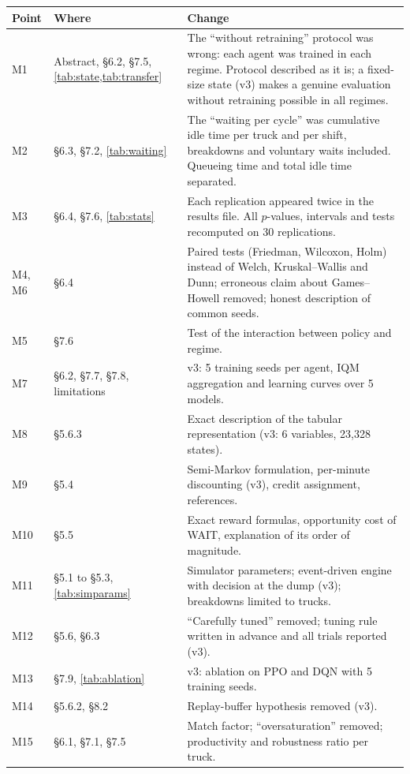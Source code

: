 \documentclass[11pt,a4paper]{article}
\begin{document}
\footnotesize
\begin{longtable}{p{2.2cm}p{4.3cm}p{8.6cm}}
\toprule
\textbf{Point} & \textbf{Where} & \textbf{Change} \\
\midrule
\endhead
M1 & Abstract, §6.2, §7.5, \cref{tab:state,tab:transfer} & The ``without retraining'' protocol was wrong: each agent was trained in each regime. Protocol described as it is; a fixed-size state (v3) makes a genuine evaluation without retraining possible in all regimes. \\
M2 & §6.3, §7.2, \cref{tab:waiting} & The ``waiting per cycle'' was cumulative idle time per truck and per shift, breakdowns and voluntary waits included. Queueing time and total idle time separated. \\
M3 & §6.4, §7.6, \cref{tab:stats} & Each replication appeared twice in the results file. All $p$-values, intervals and tests recomputed on 30 replications. \\
M4, M6 & §6.4 & Paired tests (Friedman, Wilcoxon, Holm) instead of Welch, Kruskal--Wallis and Dunn; erroneous claim about Games--Howell removed; honest description of common seeds. \\
M5 & §7.6 & Test of the interaction between policy and regime. \\
M7 & §6.2, §7.7, §7.8, limitations & v3: 5 training seeds per agent, IQM aggregation and learning curves over 5 models. \\
M8 & §5.6.3 & Exact description of the tabular representation (v3: 6 variables, 23,328 states). \\
M9 & §5.4 & Semi-Markov formulation, per-minute discounting (v3), credit assignment, references. \\
M10 & §5.5 & Exact reward formulas, opportunity cost of WAIT, explanation of its order of magnitude. \\
M11 & §5.1 to §5.3, \cref{tab:simparams} & Simulator parameters; event-driven engine with decision at the dump (v3); breakdowns limited to trucks. \\
M12 & §5.6, §6.3 & ``Carefully tuned'' removed; tuning rule written in advance and all trials reported (v3). \\
M13 & §7.9, \cref{tab:ablation} & v3: ablation on PPO and DQN with 5 training seeds. \\
M14 & §5.6.2, §8.2 & Replay-buffer hypothesis removed (v3). \\
M15 & §6.1, §7.1, §7.5 & Match factor; ``oversaturation'' removed; productivity and robustness ratio per truck. \\

\end{longtable}
\end{document}
